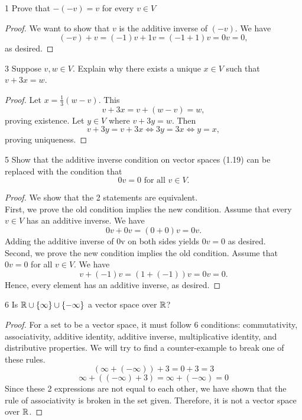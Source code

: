 \documentclass[12pt, letterpaper]{article}
\begin{document}
\begin{problem}{1}						%
Prove that $-(-v)=v$ for every $v\in V$																				%
\end{problem}

\begin{proof}       						%
We want to show that $v$ is the additive inverse of $(-v)$. We have 
$$(-v)+v=(-1)v+1v=(-1+1)v=0v=0,$$
as desired.
\end{proof}

\begin{problem}{3}
Suppose $v,w\in V$. Explain why there exists a unique $x\in V$ such that $v+3x=w$.
\end{problem}

\begin{proof}
Let $x=\frac{1}{3}(w-v)$. This
$$v+3x=v+(w-v)=w,$$
proving existence.
Let $y\in V$ where $v+3y=w$. Then
$$v+3y=v+3x\iff 3y=3x\iff y=x,$$
proving uniqueness.
\end{proof}

\begin{problem}{5}
Show that the additive inverse condition on vector spaces (1.19) 
can be replaced with the condition that
$$0v=0 \text{ for all } v\in V.$$
\end{problem}

\begin{proof}
We show that the 2 statements are equivalent.\\
First, we prove the old condition implies the new condition.
Assume that every $v\in V$ has an additive inverse.
We have
$$0v+0v=(0+0)v=0v.$$
Adding the additive inverse of 0v on both sides yields
$0v=0$ as desired.\\
Second, we prove the new condition implies the old condition.
Assume that $0v=0$ for all $v\in V$.
We have
$$v+(-1)v=(1+(-1))v=0v=0.$$
Hence, every element has an additive inverse, as desired.
\end{proof}

\begin{problem}{6}
Is $\mathbb{R}\cup\{\infty\}\cup\{-\infty\}$ a vector space over $\mathbb{R}$?
\end{problem}

\begin{proof}
For a set to be a vector space, it must follow 6 conditions:
commutativity, associativity, additive identity, additive inverse, multiplicative identity, and distributive properties.
We will try to find a counter-example to break one of these rules.
$$(\infty+(-\infty))+3=0+3=3$$
$$\infty+((-\infty)+3)=\infty+(-\infty)=0$$
Since these 2 expressions are not equal to each other, we have shown that the rule of associativity
is broken in the set given. Therefore, it is not a vector space over $\mathbb{R}$.
\end{proof}
\end{document}
